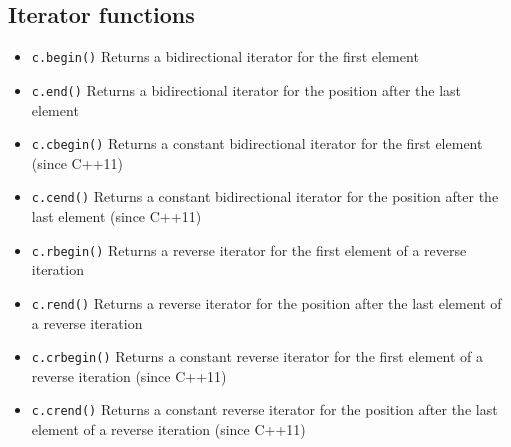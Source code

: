 \documentclass{report}
\begin{document}
\subsection{Iterator functions}
\begin{itemize}
    \item \texttt{c.begin()} Returns a bidirectional iterator for the first element
    \item \texttt{c.end()} Returns a bidirectional iterator for the position after the last element
    \item \texttt{c.cbegin()} Returns a constant bidirectional iterator for the first element (since C++11)
    \item \texttt{c.cend()} Returns a constant bidirectional iterator for the position after the last element (since C++11)
    \item \texttt{c.rbegin()} Returns a reverse iterator for the first element of a reverse iteration
    \item \texttt{c.rend()} Returns a reverse iterator for the position after the last element of a reverse iteration
    \item \texttt{c.crbegin()} Returns a constant reverse iterator for the first element of a reverse iteration (since C++11)
    \item \texttt{c.crend()} Returns a constant reverse iterator for the position after the last element of a reverse iteration (since C++11)
\end{itemize}

\bigbreak \noindent 
\end{document}
